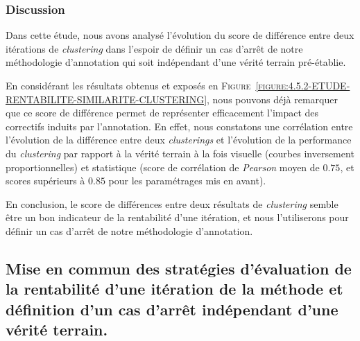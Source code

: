 		\subsubsection{Discussion}
		
			Dans cette étude, nous avons analysé l'évolution du score de différence entre deux itérations de \textit{clustering} dans l'espoir de définir un cas d'arrêt de notre méthodologie d'annotation qui soit indépendant d'une vérité terrain pré-établie.
			
			En considérant les résultats obtenus et exposés en \textsc{Figure~\ref{figure:4.5.2-ETUDE-RENTABILITE-SIMILARITE-CLUSTERING}}, nous pouvons déjà remarquer que ce score de différence permet de représenter efficacement l'impact des correctifs induits par l'annotation.
			En effet, nous constatons une corrélation entre l'évolution de la différence entre deux \textit{clusterings} et l'évolution de la performance du \textit{clustering} par rapport à la vérité terrain à la fois visuelle (courbes inversement proportionnelles) et statistique (score de corrélation de \textit{Pearson} moyen de $0.75$, et scores supérieurs à $0.85$ pour les paramétrages mis en avant).
			
			
			
		
			
			En conclusion, le score de différences entre deux résultats de \textit{clustering} semble être un bon indicateur de la rentabilité d'une itération, et nous l'utiliserons pour définir un cas d'arrêt de notre méthodologie d'annotation.
			
	\subsection{Mise en commun des stratégies d'évaluation de la rentabilité d'une itération de la méthode et définition d'un cas d'arrêt indépendant d'une vérité terrain.}
	\label{section:4.5.3-ETUDE-RENTABILITE-MISE-EN-COMMUN}
			
